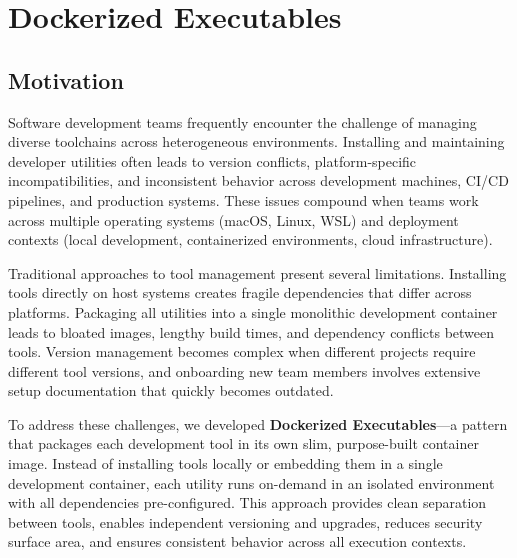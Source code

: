 \section{Dockerized Executables}


\subsection{Motivation}

Software development teams frequently encounter the challenge of managing
diverse toolchains across heterogeneous environments. Installing and
maintaining developer utilities often leads to version conflicts, platform-specific
incompatibilities, and inconsistent behavior across development
machines, CI/CD pipelines, and production systems. These issues compound
when teams work across multiple operating systems (macOS, Linux, WSL) and
deployment contexts (local development, containerized environments,
cloud infrastructure).

Traditional approaches to tool management present several limitations.
Installing tools directly on host systems creates fragile dependencies
that differ across platforms. Packaging all utilities into a single monolithic
development container leads to bloated images, lengthy build times, and
dependency conflicts between tools. Version management becomes complex
when different projects require different tool versions, and onboarding
new team members involves extensive setup documentation that quickly becomes
outdated.

To address these challenges, we developed \textbf{Dockerized
Executables}---a pattern that packages each development tool in its own
slim, purpose-built container image. Instead of installing tools locally
or embedding them in a single development container, each utility runs
on-demand in an isolated environment with all dependencies pre-configured.
This approach provides clean separation between tools, enables
independent versioning and upgrades, reduces security surface area,
and ensures consistent behavior across all execution contexts.

